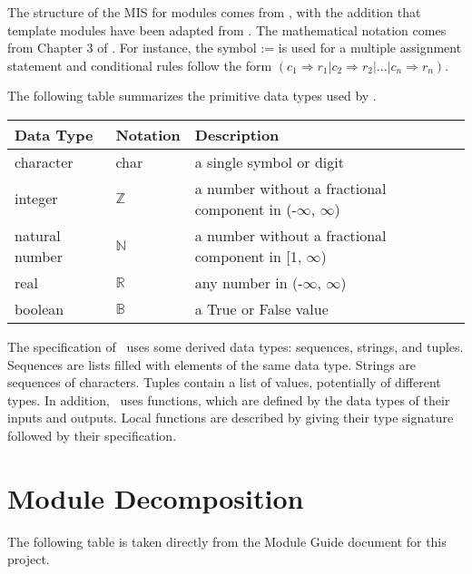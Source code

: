 \documentclass[12pt, titlepage]{article}
\begin{document}
	The structure of the MIS for modules comes from \citet{HoffmanAndStrooper1995},
	with the addition that template modules have been adapted from
	\cite{GhezziEtAl2003}.  The mathematical notation comes from Chapter 3 of
	\citet{HoffmanAndStrooper1995}.  For instance, the symbol := is used for a
	multiple assignment statement and conditional rules follow the form $(c_1
	\Rightarrow r_1 | c_2 \Rightarrow r_2 | ... | c_n \Rightarrow r_n )$.
	
	The following table summarizes the primitive data types used by \progname. 
	
	\begin{center}
		\renewcommand{\arraystretch}{1.2}
		\noindent 
		\begin{tabular}{l l p{7.5cm}} 
			\toprule 
			\textbf{Data Type} & \textbf{Notation} & \textbf{Description}\\ 
			\midrule
			character & char & a single symbol or digit\\
			integer & $\mathbb{Z}$ & a number without a fractional component in (-$\infty$, $\infty$) \\
			natural number & $\mathbb{N}$ & a number without a fractional component in [1, $\infty$) \\
			real & $\mathbb{R}$ & any number in (-$\infty$, $\infty$)\\
			boolean & $\mathbb{B}$ & a True or False value\\
			\bottomrule
		\end{tabular} 
	\end{center}
	
	\noindent
	The specification of \progname \ uses some derived data types: sequences, strings, and
	tuples. Sequences are lists filled with elements of the same data type. Strings
	are sequences of characters. Tuples contain a list of values, potentially of
	different types. In addition, \progname \ uses functions, which
	are defined by the data types of their inputs and outputs. Local functions are
	described by giving their type signature followed by their specification.
	
	\newpage
	\section{Module Decomposition}
	
	The following table is taken directly from the Module Guide document for this project.
	
\end{document}
